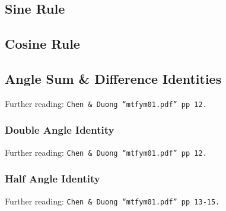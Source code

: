\subsection{Sine Rule}
\label{subsec:TR Trigonometric Identities - Sine Rule}

\subsection{Cosine Rule}
\label{subsec:TR Trigonometric Identities - Cosine Rule}

\subsection{Angle Sum \& Difference Identities}
\label{subsec:TR Trigonometric Identities - Angle Sum Identities}
Further reading: \texttt{Chen \& Duong ``mtfym01.pdf'' pp 12.}

\subsubsection{Double Angle Identity}
\label{subsubsec:TR Trigonometric Identities - Angle Sum Identities - Double Angle Identity}
Further reading: \texttt{Chen \& Duong ``mtfym01.pdf'' pp 12.}

\subsubsection{Half Angle Identity}
\label{subsubsec:TR Trigonometric Identities - Angle Sum Identities - Half Angle Identity}
Further reading: \texttt{Chen \& Duong ``mtfym01.pdf'' pp 13-15.}